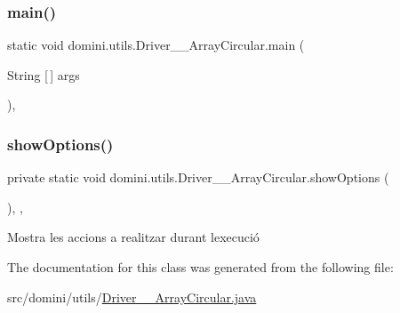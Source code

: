 \subsubsection{\texorpdfstring{main()}{main()}}
{\footnotesize\ttfamily static void domini.\+utils.\+Driver\+\_\+\+\_\+\+Array\+Circular.\+main (\begin{DoxyParamCaption}\item[{String \mbox{[}$\,$\mbox{]}}]{args }\end{DoxyParamCaption})\hspace{0.3cm}{\ttfamily [inline]}, {\ttfamily [static]}}

\mbox{\label{classdomini_1_1utils_1_1Driver____ArrayCircular_afac5a37f91b2914e692993e71c2d393c}} 
\subsubsection{\texorpdfstring{show\+Options()}{showOptions()}}
{\footnotesize\ttfamily private static void domini.\+utils.\+Driver\+\_\+\+\_\+\+Array\+Circular.\+show\+Options (\begin{DoxyParamCaption}{ }\end{DoxyParamCaption})\hspace{0.3cm}{\ttfamily [inline]}, {\ttfamily [static]}, {\ttfamily [private]}}



Mostra les accions a realitzar durant l\textquotesingle{}execució 



The documentation for this class was generated from the following file\+:\begin{DoxyCompactItemize}
\item 
src/domini/utils/\hyperlink{Driver____ArrayCircular_8java}{Driver\+\_\+\+\_\+\+Array\+Circular.\+java}\end{DoxyCompactItemize}
